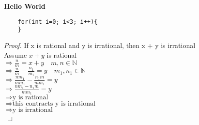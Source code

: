 \documentclass{article}
\begin{document}
\textbf{Hello World}
\begin{verbatim}
    for(int i=0; i<3; i++){
    }
\end{verbatim}

\begin{proof}
If x is rational and y is irrational, then x + y is irrational \\
Assume $x + y$ is rational \\
    $\Rightarrow \frac{n}{m} = x + y  \quad m, n \in  \mathbb{N}$ \\ 
    $\Rightarrow \frac{n}{m} - \frac{n_1}{m_1} = y \quad m_1, n_1 \in  \mathbb{N}$ \\
    $\Rightarrow \frac{n m_1}{m m_1} - \frac{n_1 m}{m m_1} = y$  \\
    $\Rightarrow \frac{n m_1 - n_1 m}{m m_1} = y$  \\
    $\Rightarrow \mbox{y is rational}$  \\
    $\Rightarrow \mbox{this contracts y is irrational}$ \\
    $\Rightarrow \mbox{y is irrational}$ \\
\end{proof}
\end{document}

